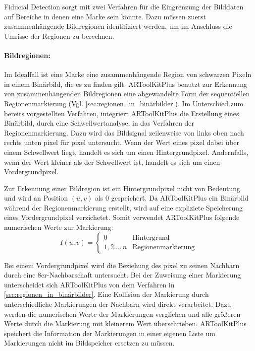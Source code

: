 Fiducial Detection sorgt mit zwei Verfahren für die Eingrenzung der Bilddaten auf Bereiche in denen eine Marke sein
 könnte. Dazu müssen zuerst zusammenhängende Bildregionen identifiziert werden, um im Anschluss die Umrisse der
 Regionen zu berechnen.

\paragraph{Bildregionen:} %
\label{par:bildregionen}
Im Idealfall ist eine Marke eine zusammenhängende Region von schwarzen Pixeln in einem Binärbild, die es zu finden
 gilt. ARToolKitPlus benutzt zur Erkennung von zusammenhängenden Bildregionen eine abgewandelte Form der sequentiellen
 Regionenmarkierung (Vgl. \autoref{sec:regionen_in_binärbilder}). Im Unterschied zum bereits vorgestellten Verfahren,
 integriert ARToolKitPlus die Erstellung eines Binärbild, durch eine Schwellwertanalyse, in das Verfahren der
 Regionenmarkierung. Dazu wird das Bildsignal zeilenweise von links oben nach rechts unten \gls{pixel} für \gls{pixel}
 untersucht. Wenn der Wert eines \gls{pixel} dabei über einem Schwellwert liegt, handelt es sich um einen
 Hintergrundpixel. Andernfalls, wenn der Wert kleiner als der Schwellwert ist, handelt es sich um einen
 Vordergrundpixel.

Zur Erkennung einer Bildregion ist ein Hintergrundpixel nicht von Bedeutung und wird an Position $(u,v)$ als $0$
 gespeichert. Da ARToolKitPlus ein Binärbild während der Regionenmarkierung erstellt, wird auf eine expliziete
 Speicherung eines Vordergrundpixel verzichetet. Somit verwendet ARToolKitPlus folgende numerischen Werte zur
 Markierung:
\begin{equation*}
	I(u,v) = \begin{cases}
	0 & \textrm{Hintergrund}\\
	1,2\ldots,n & \textrm{Regionenmarkierung}
	\end{cases}
\end{equation*}

Bei einem Vordergrundpixel wird die Beziehung des \gls{pixel} zu seinen Nachbarn durch eine 8er-Nachbarschaft
 untersucht. Bei der Zuweisung einer Markierung unterscheidet sich ARToolKitPlus von dem Verfahren in
 \autoref{sec:regionen_in_binärbilder}. Eine Kollision der Markierung durch unterschiedliche Markierungen der Nachbarn
 wird direkt verarbeitet. Dazu werden die numerischen Werte der Markierungen verglichen und alle größeren Werte durch
 die Markierung mit kleinerem Wert überschrieben. ARToolKitPlus speichert die Information der Markierungen in einer
 eigenen Liste um Markierungen nicht im Bildspeicher ersetzen zu müssen.


